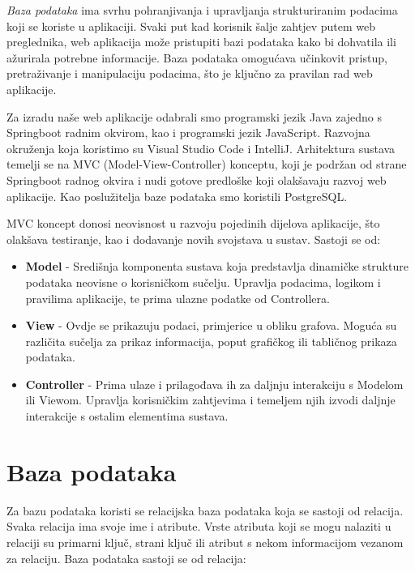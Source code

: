 	\textit{Baza podataka} ima svrhu pohranjivanja i upravljanja strukturiranim podacima koji se koriste u aplikaciji. Svaki put kad korisnik šalje zahtjev putem web preglednika, web aplikacija može pristupiti bazi podataka kako bi dohvatila ili ažurirala potrebne informacije. Baza podataka omogućava učinkovit pristup, pretraživanje i manipulaciju podacima, što je ključno za pravilan rad web aplikacije.
	
	Za izradu naše web aplikacije odabrali smo programski jezik Java zajedno s Springboot radnim okvirom, kao i programski jezik JavaScript. Razvojna okruženja koja koristimo su Visual Studio Code i IntelliJ. Arhitektura sustava temelji se na MVC (Model-View-Controller) konceptu, koji je podržan od strane Springboot radnog okvira i nudi gotove predloške koji olakšavaju razvoj web aplikacije. Kao poslužitelja baze podataka smo koristili PostgreSQL.
	
	MVC koncept donosi neovisnost u razvoju pojedinih dijelova aplikacije, što olakšava testiranje, kao i dodavanje novih svojstava u sustav. Sastoji se od:
	
	\begin{itemize}
		\item \textbf{Model} - Središnja komponenta sustava koja predstavlja dinamičke strukture podataka neovisne o korisničkom sučelju. Upravlja podacima, logikom i pravilima aplikacije, te prima ulazne podatke od Controllera.
		\item \textbf{View} - Ovdje se prikazuju podaci, primjerice u obliku grafova. Moguća su različita sučelja za prikaz informacija, poput grafičkog ili tabličnog prikaza podataka.
		\item \textbf{Controller} - Prima ulaze i prilagođava ih za daljnju interakciju s Modelom ili Viewom. Upravlja korisničkim zahtjevima i temeljem njih izvodi daljnje interakcije s ostalim elementima sustava.
	\end{itemize}
		

		

				
		\section{Baza podataka}
				
				Za bazu podataka koristi se relacijska baza podataka koja se sastoji od relacija. Svaka relacija ima svoje ime i atribute. Vrste atributa koji se mogu nalaziti u relaciji su primarni ključ, strani ključ ili atribut s nekom informacijom vezanom za relaciju. Baza podataka sastoji se od relacija:
		

